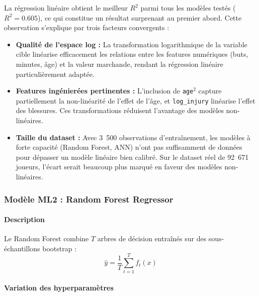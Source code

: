 \documentclass[12pt,a4paper]{article}
\begin{document}
La régression linéaire obtient le meilleur $R^2$ parmi tous les modèles testés
($R^2 = 0.605$), ce qui constitue un résultat surprenant au premier abord. Cette
observation s'explique par trois facteurs convergents :

\begin{itemize}[leftmargin=*]
    \item \textbf{Qualité de l'espace log :} La transformation logarithmique de la
    variable cible linéarise efficacement les relations entre les features numériques
    (buts, minutes, âge) et la valeur marchande, rendant la régression linéaire
    particulièrement adaptée.

    \item \textbf{Features ingénierées pertinentes :} L'inclusion de \texttt{age}$^2$
    capture partiellement la non-linéarité de l'effet de l'âge, et \texttt{log\_injury}
    linéarise l'effet des blessures. Ces transformations réduisent l'avantage des
    modèles non-linéaires.

    \item \textbf{Taille du dataset :} Avec 3~500 observations d'entraînement, les
    modèles à forte capacité (Random Forest, ANN) n'ont pas suffisamment de données
    pour dépasser un modèle linéaire bien calibré. Sur le dataset réel de 92~671
    joueurs, l'écart serait beaucoup plus marqué en faveur des modèles non-linéaires.
\end{itemize}

\newpage

\subsubsection{Modèle ML2 : Random Forest Regressor}

\paragraph{Description}

Le Random Forest combine $T$ arbres de décision entraînés sur des sous-échantillons
bootstrap :
\[
\hat{y} = \frac{1}{T} \sum_{t=1}^{T} f_t(x)
\]

\paragraph{Variation des hyperparamètres}
\end{document}
